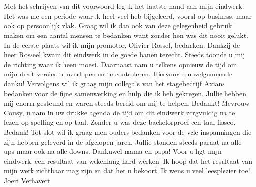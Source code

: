 
\chapter*{}
\label{ch:voorwoord}

Met het schrijven van dit voorwoord leg ik het laatste hand aan mijn eindwerk. Het was me een periode waar ik heel veel heb bijgeleerd, vooral op business, maar ook op persoonlijk vlak.  Graag wil ik dan ook van deze gelegenheid gebruik maken om een aantal mensen te bedanken want zonder hen was dit nooit gelukt. 
\newline
\newline
In de eerste plaats wil ik mijn promotor, Olivier Rossel, bedanken. Dankzij de heer Rosseel kwam dit eindwerk in de goede banen terecht. Steeds toonde u mij de richting waar ik heen moest. Daarnaast nam u telkens opnieuw de tijd om mijn draft versies te overlopen en te controleren. Hiervoor een welgemeende danku!
\newline
\newline
Vervolgens wil ik graag mijn collega’s van het stagebedrijf Axians bedanken voor de fijne samenwerking en hulp die ik heb gekregen. Jullie hebben mij enorm gesteund en waren steeds bereid om mij te helpen. Bedankt!
\newline
\newline
Mevrouw Cousy, u nam in uw drukke agenda de tijd om dit eindwerk zorgvuldig na te lezen op spelling en op taal. Zonder u was deze bachelorproef een taal fiasco. Bedank!
\newline
\newline
Tot slot wil ik graag men ouders bedanken voor de vele inspanningen die zijn hebben geleverd in de afgelopen jaren. Jullie stonden steeds paraat na alle ups maar ook na alle downs. Dankuwel mama en papa!
\newline
\newline
Voor u ligt mijn eindwerk, een resultaat van wekenlang hard werken. Ik hoop dat het resultaat van mijn werk zichtbaar mag zijn en dat het u bekoort. 
\newline
\newline
Ik wens u veel leesplezier toe!
\newline
Joeri Verhavert




